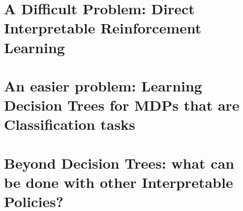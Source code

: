 \documentclass[11pt,space=onehalf,version=final]{yathesis}
\begin{document}
\part{A Difficult Problem: Direct Interpretable Reinforcement Learning}
% 

%



%

%
%
\part{An easier problem: Learning Decision Trees for MDPs that are Classification tasks}
%

%

%



\part{Beyond Decision Trees: what can be done with other Interpretable Policies?}





%
%
%
%

%
\printbibliography
%
\appendix
%


%
\backmatter
%
%
%
\tableofcontents
%
%
\end{document}

